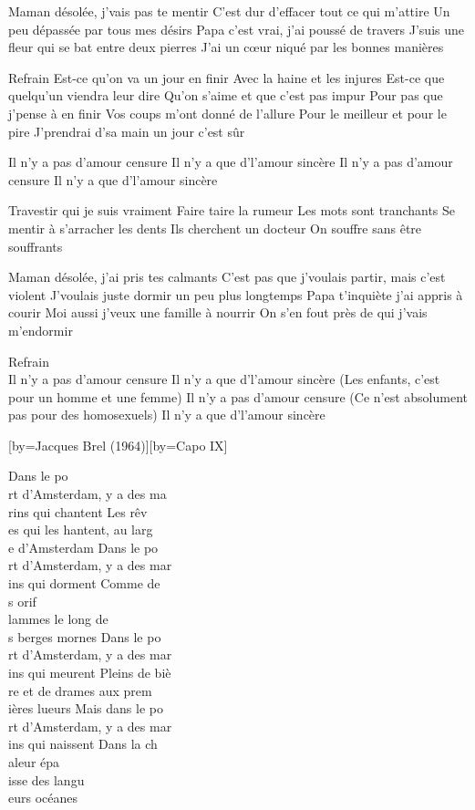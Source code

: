 \beginverse
Maman désolée, j'vais pas te mentir
C'est dur d'effacer tout ce qui m'attire
Un peu dépassée par tous mes désirs
Papa c'est vrai, j'ai poussé de travers
J'suis une fleur qui se bat entre deux pierres
J'ai un cœur niqué par les bonnes manières
\endverse

\beginverse
Refrain
Est-ce qu'on va un jour en finir
Avec la haine et les injures
Est-ce que quelqu'un viendra leur dire
Qu'on s'aime et que c'est pas impur
Pour pas que j'pense à en finir
Vos coups m'ont donné de l'allure
Pour le meilleur et pour le pire
J'prendrai d'sa main un jour c'est sûr
\endverse

\beginverse
Il n'y a pas d'amour censure
Il n'y a que d'l'amour sincère
Il n'y a pas d'amour censure
Il n'y a que d'l'amour sincère
\endverse

\beginverse
Travestir qui je suis vraiment
Faire taire la rumeur
Les mots sont tranchants
Se mentir à s'arracher les dents
Ils cherchent un docteur
On souffre sans être souffrants
\endverse

\beginverse
Maman désolée, j'ai pris tes calmants
C'est pas que j'voulais partir, mais c'est violent
J'voulais juste dormir un peu plus longtemps
Papa t'inquiète j'ai appris à courir
Moi aussi j'veux une famille à nourrir
On s'en fout près de qui j'vais m'endormir
\endverse

	Refrain\\[2x]

\beginverse
Il n'y a pas d'amour censure
Il n'y a que d'l'amour sincère
(Les enfants, c'est pour un homme et une femme)
Il n'y a pas d'amour censure
(Ce n'est absolument pas pour des homosexuels)
Il n'y a que d'l'amour sincère
\endverse

[by={Jacques Brel (1964)}][by={Capo IX}]

\beginverse
Dans le po\\[Lam]rt d'Amsterdam, y a des ma\\[Mim]rins qui chantent 
Les rêv\\[Fa]es qui les hantent, au larg\\[Mim7]e d'Amsterdam
Dans le po\\[Lam]rt d'Amsterdam, y a des mar\\[Mim]ins qui dorment 
Comme de\\[Fa]s orif\\[Mi7]lammes le long de\\[Lam]s berges mornes 
Dans le po\\[Do]rt d'Amsterdam, y a des mar\\[Sol7]ins qui meurent
Pleins de biè\\[Lam]re et de drames aux prem\\[Mi7]ières lueurs
Mais dans le po\\[Fa]rt d'Amsterdam, y a des mar\\[Mim]ins qui naissent 
Dans la ch\\[Fa]aleur épa\\[Mi7]isse des langu\\[Lam]eurs océanes
\endverse

